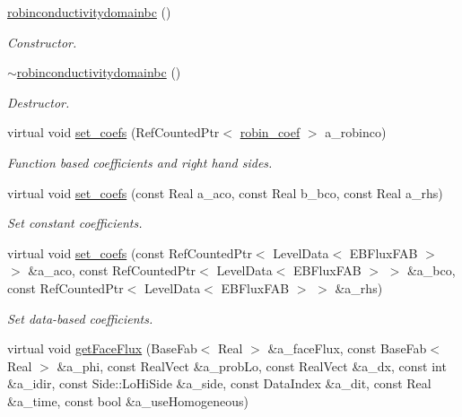 \begin{DoxyCompactItemize}
\item 
\hyperlink{classrobinconductivitydomainbc_afced6773662e058818ab1e218fdc8f22}{robinconductivitydomainbc} ()
\begin{DoxyCompactList}\small\item\em Constructor. \end{DoxyCompactList}\item 
\hyperlink{classrobinconductivitydomainbc_a6a86f41590eb501ed9816f311b7a14de}{$\sim$robinconductivitydomainbc} ()
\begin{DoxyCompactList}\small\item\em Destructor. \end{DoxyCompactList}\item 
virtual void \hyperlink{classrobinconductivitydomainbc_a34669c6e690da2786f4134153bf46996}{set\+\_\+coefs} (Ref\+Counted\+Ptr$<$ \hyperlink{classrobin__coef}{robin\+\_\+coef} $>$ a\+\_\+robinco)
\begin{DoxyCompactList}\small\item\em Function based coefficients and right hand sides. \end{DoxyCompactList}\item 
virtual void \hyperlink{classrobinconductivitydomainbc_a2f912f0d0f10f2694a1884abebd396dc}{set\+\_\+coefs} (const Real a\+\_\+aco, const Real b\+\_\+bco, const Real a\+\_\+rhs)
\begin{DoxyCompactList}\small\item\em Set constant coefficients. \end{DoxyCompactList}\item 
virtual void \hyperlink{classrobinconductivitydomainbc_a628ce2ad458b38e78feaef34ec8bbebb}{set\+\_\+coefs} (const Ref\+Counted\+Ptr$<$ Level\+Data$<$ E\+B\+Flux\+F\+AB $>$ $>$ \&a\+\_\+aco, const Ref\+Counted\+Ptr$<$ Level\+Data$<$ E\+B\+Flux\+F\+AB $>$ $>$ \&a\+\_\+bco, const Ref\+Counted\+Ptr$<$ Level\+Data$<$ E\+B\+Flux\+F\+AB $>$ $>$ \&a\+\_\+rhs)
\begin{DoxyCompactList}\small\item\em Set data-\/based coefficients. \end{DoxyCompactList}\item 
virtual void \hyperlink{classrobinconductivitydomainbc_a500c91e0200263d926b6b1a0d0003eb4}{get\+Face\+Flux} (Base\+Fab$<$ Real $>$ \&a\+\_\+face\+Flux, const Base\+Fab$<$ Real $>$ \&a\+\_\+phi, const Real\+Vect \&a\+\_\+prob\+Lo, const Real\+Vect \&a\+\_\+dx, const int \&a\+\_\+idir, const Side\+::\+Lo\+Hi\+Side \&a\+\_\+side, const Data\+Index \&a\+\_\+dit, const Real \&a\+\_\+time, const bool \&a\+\_\+use\+Homogeneous)

\end{DoxyCompactItemize}
